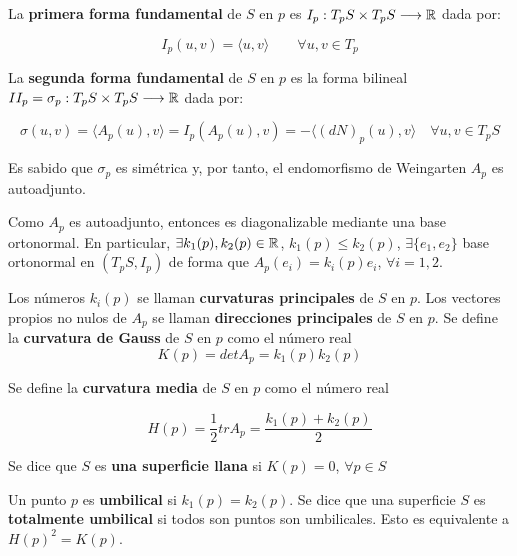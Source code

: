 \begin{definition}
La \textbf{primera forma fundamental} de $S$ en $p$ es $I_p: T_pS \times T_pS \longrightarrow \mathbb{R}$ dada por: 

\begin{equation*}
    I_p(u,v) =  \langle u,v \rangle \qquad \forall u,v \in T_p
\end{equation*}

La \textbf{segunda forma fundamental} de $S$ en $p$ es la forma bilineal $II_p = \sigma_p: T_pS \times T_pS \longrightarrow \mathbb{R}$ dada por: 

\begin{equation*}
    \sigma(u,v) = \langle A_p(u),v \rangle  = I_p(A_p(u),v) = - \langle (dN)_p(u), v \rangle \quad \forall u,v \in T_pS
\end{equation*}

\end{definition}

Es sabido que $\sigma_p$ es simétrica y, por tanto, el endomorfismo de Weingarten $A_p$ es autoadjunto.

Como $A_p$ es autoadjunto, entonces es diagonalizable mediante una base ortonormal. En particular, $\exists k_1(p), k_2(p) \in \mathbb{R}$, $k_1(p) \leq k_2(p)$, $\exists \{e_1,e_2\}$ base ortonormal en $(T_pS, I_p)$ de forma que $A_p(e_i) = k_i(p)e_i$, $\forall i = 1,2$.

Los números $k_i(p)$ se llaman \textbf{curvaturas principales} de $S$ en $p$.
Los vectores propios no nulos de $A_p$ se llaman \textbf{direcciones principales} de $S$ en $p$.
Se define la \textbf{curvatura de Gauss} de $S$ en $p$ como el número real 
%
\begin{equation*}
    K(p)=det A_p=k_1(p)k_2(p)
\end{equation*}

Se define la \textbf{curvatura media} de $S$ en $p$ como el número real 

\begin{equation*}
    H(p)=\frac{1}{2}tr A_p=\frac{k_1(p)+k_2(p)}{2}
\end{equation*}

Se dice que $S$ es \textbf{una superficie llana} si $K(p)=0$, $\forall p \in S$

\begin{definition}
Un punto $p$ es \textbf{umbilical} si $k_1(p)=k_2(p)$.
Se dice que una superficie $S$ es \textbf{totalmente umbilical} si todos son puntos son umbilicales. Esto es equivalente a $H(p)^2=K(p)$.
\end{definition}

